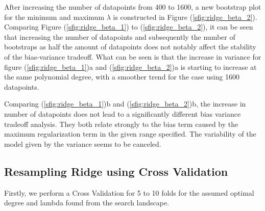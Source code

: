 \documentclass[11pt, a4paper]{article}
\begin{document}
After increasing the number of datapoints from 400 to 1600, a new bootstrap plot for the minimum and maximum $\lambda$ is constructed in Figure (\ref{sfig:ridge_beta_2}). Comparing Figure (\ref{sfig:ridge_beta_1}) to (\ref{sfig:ridge_beta_2}), it can be seen that increasing the number of datapoints and subsequently the number of bootstraps as half the amount of datapoints does not notably affect the stability of the bias-variance tradeoff. What can be seen is that the increase in variance
for figure (\ref{sfig:ridge_beta_1})a and (\ref{sfig:ridge_beta_2})a is starting to increase at the same polynomial degree, with a smoother trend for the case using 1600 datapoints.

Comparing (\ref{sfig:ridge_beta_1})b and (\ref{sfig:ridge_beta_2})b, the increase in number of datapoints
does not lead to a significantly different bias variance tradeoff analysis. They both relate strongly to the bias term caused by the maximum regularization term in the given range specified. The variability of the model given by the variance seems to be canceled.

\subsection*{Resampling Ridge using Cross Validation}
Firstly, we perform a Cross Validation for 5 to 10 folds for the assumed optimal degree and lambda found from the search landscape.
\end{document}
